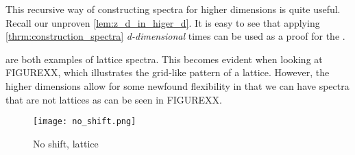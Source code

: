 \documentclass[../thesis.tex]{subfiles}
\begin{document}
This recursive way of constructing spectra for higher dimensions is quite useful. Recall our unproven \cref{lem:z_d_in_higer_d}. It is easy to see that applying \cref{thrm:construction_spectra} \emph{d-dimensional} times can be used as a proof for the .



 are both examples of lattice spectra. This becomes evident when looking at FIGUREXX, which illustrates the grid-like pattern of a lattice. However, the higher dimensions allow for some newfound flexibility in that we can have spectra that are not lattices as can be seen in FIGUREXX. 

\begin{figure}[]%
    \centering
    \texttt{[image: no\_shift.png]}
    \caption{No shift, lattice}
    \label{fig:no_shift}
\end{figure}
\end{document}
